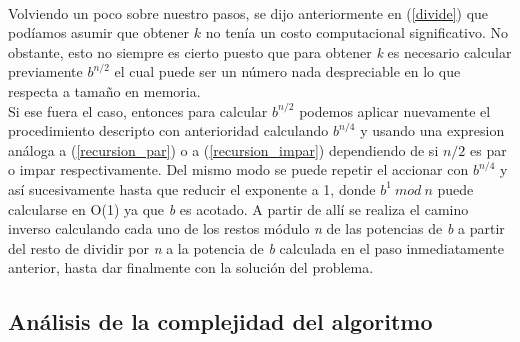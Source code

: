 \paragraph{}
Volviendo un poco sobre nuestro pasos, se dijo anteriormente en (\ref{divide}) que podíamos asumir que obtener $k$ no tenía un costo computacional significativo. No obstante, esto no siempre es cierto puesto que para obtener \textit{k} es necesario calcular previamente $b^{n/2}$ el cual puede ser un número nada despreciable en lo que respecta a tamaño en memoria.\\
Si ese fuera el caso, entonces para calcular $b^{n/2}$ podemos aplicar nuevamente el procedimiento descripto con anterioridad calculando $b^{n/4}$ y usando una expresion análoga a (\ref{recursion_par}) o a (\ref{recursion_impar}) dependiendo de si $n/2$ es par o impar respectivamente. Del mismo modo se puede repetir el accionar con $b^{n/4}$ y así sucesivamente hasta que reducir el exponente a 1, donde $b^1\ mod\ n$ puede calcularse en O(1) ya que \textit{b} es acotado. A partir de allí se realiza el camino inverso calculando cada uno de los restos módulo \textit{n} de las potencias de \textit{b} a partir del resto de dividir por \textit{n} a la potencia de \textit{b} calculada en el paso inmediatamente anterior, hasta dar finalmente con la solución del problema.


\subsection{Análisis de la complejidad del algoritmo}

